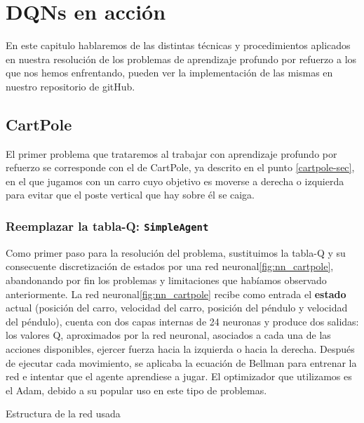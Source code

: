 \chapter{DQNs en acción}
\label{cap:dqnEnAccion}


En este capitulo hablaremos de las distintas técnicas y procedimientos aplicados en nuestra resolución de los problemas de aprendizaje profundo por refuerzo a los que nos hemos enfrentando, pueden ver la implementación de las mismas en nuestro repositorio de gitHub.

\section{CartPole}
\label{sec:cartpoleDQN}

El primer problema que trataremos al trabajar con aprendizaje profundo por refuerzo se corresponde con el de CartPole, ya descrito en el punto \ref{cartpole-sec}, en el que jugamos con un carro cuyo objetivo es moverse a derecha o izquierda para evitar que el poste vertical que hay sobre él se caiga.


\subsection{Reemplazar la tabla-Q: \texttt{SimpleAgent}}

Como primer paso para la resolución del problema, sustituimos la tabla-Q y su consecuente discretización de estados por una red neuronal\ref{fig:nn_cartpole}, abandonando por fin los problemas y limitaciones que habíamos observado anteriormente. La red neuronal\ref{fig:nn_cartpole} recibe como entrada el \textbf{estado} actual (posición del carro, velocidad del carro, posición del péndulo y velocidad del péndulo), cuenta con dos capas internas de 24 neuronas y produce dos salidas: los valores Q, aproximados por la red neuronal, asociados a cada una de las acciones disponibles, ejercer fuerza hacia la izquierda o hacia la derecha. Después de ejecutar cada movimiento, se aplicaba la ecuación de Bellman para entrenar la red e intentar que el agente aprendiese a jugar. El optimizador que utilizamos es el Adam, debido a su popular uso en este tipo de problemas.

%
       {Estructura de la red usada}

